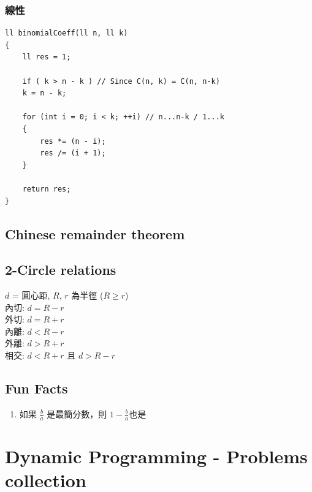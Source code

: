 \documentclass[10pt,oneside]{article}
\begin{document}
\begin{landscape}
\begin{multicols}{2}

\subsubsection{線性}

\begin{verbatim}
ll binomialCoeff(ll n, ll k)
{
    ll res = 1;
    
    if ( k > n - k ) // Since C(n, k) = C(n, n-k)
    k = n - k;
    
    for (int i = 0; i < k; ++i) // n...n-k / 1...k
    {
        res *= (n - i);
        res /= (i + 1);
    }
    
    return res;
}
\end{verbatim}

\subsection{Chinese remainder theorem}

\subsection{2-Circle relations}

{\normalsize 
$d$ = 圓心距, $R$, $r$ 為半徑 ($R \geq r$)\\
內切: $d = R - r$\\
外切: $d = R + r$\\
內離: $d < R - r$\\
外離: $d > R + r$\\
相交: $d < R + r$ 且 $d > R - r$
}

\subsection{Fun Facts}

{\normalsize 
\begin{enumerate}
	\item 如果 $\frac b a$ 是最簡分數，則 $1 - \frac b a$也是%
\end{enumerate}
}


\section{Dynamic Programming - Problems collection}

% 

\end{multicols}
\end{landscape}
\end{document}
